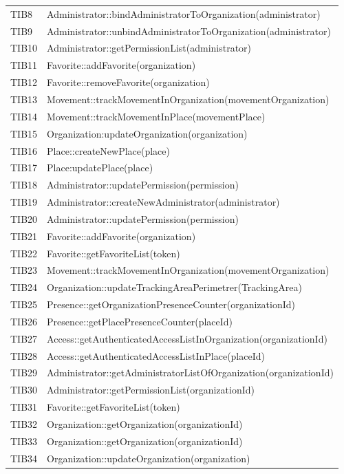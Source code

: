 {\begin{longtable}{C{2cm} C{12cm}}
	TIB8 & Administrator::bindAdministratorToOrganization(administrator) \\
	TIB9 & Administrator::unbindAdministratorToOrganization(administrator) \\
	TIB10 & Administrator::getPermissionList(administrator)\\
	TIB11 & Favorite::addFavorite(organization) \\
	TIB12 & Favorite::removeFavorite(organization) \\
	TIB13 & Movement::trackMovementInOrganization(movementOrganization)\\
	TIB14 & Movement::trackMovementInPlace(movementPlace) \\
	TIB15 & Organization:updateOrganization(organization) \\
	TIB16 & Place::createNewPlace(place) \\
	TIB17 & Place:updatePlace(place) \\
	TIB18 & Administrator::updatePermission(permission) \\
	TIB19 & Administrator::createNewAdministrator(administrator) \\
	TIB20 & Administrator::updatePermission(permission)\\
	TIB21 & Favorite::addFavorite(organization) \\
	TIB22 & Favorite::getFavoriteList(token) \\
	TIB23 & Movement::trackMovementInOrganization(movementOrganization) \\
	TIB24 & Organization::updateTrackingAreaPerimetrer(TrackingArea) \\
	TIB25 & Presence::getOrganizationPresenceCounter(organizationId) \\
	TIB26 & Presence::getPlacePresenceCounter(placeId) \\
	TIB27 & Access::getAuthenticatedAccessListInOrganization(organizationId) \\
	TIB28 & Access::getAuthenticatedAccessListInPlace(placeId) \\
	TIB29 & Administrator::getAdministratorListOfOrganization(organizationId) \\
	TIB30 & Administrator::getPermissionList(organizationId) \\
	TIB31 & Favorite::getFavoriteList(token) \\
	TIB32 & Organization::getOrganization(organizationId) \\
	TIB33 & Organization::getOrganization(organizationId) \\
	TIB34 & Organization::updateOrganization(organization) \\

\end{longtable}}
